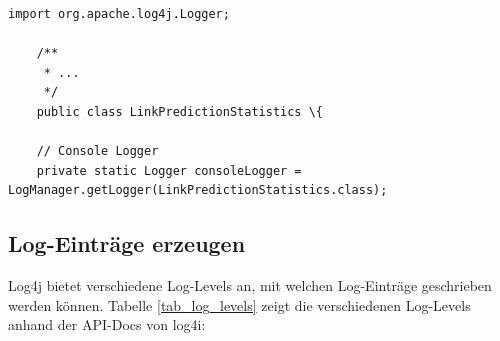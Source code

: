 \begin{lstlisting}[caption={Erzeugen eines Loggers},label=lstLoggerCreate]
    import org.apache.log4j.Logger;

    /**
     * ...
     */
    public class LinkPredictionStatistics \{

    // Console Logger
    private static Logger consoleLogger = LogManager.getLogger(LinkPredictionStatistics.class);
\end{lstlisting}

\subsection{Log-Einträge erzeugen}
Log4j bietet verschiedene Log-Levels an, mit welchen Log-Einträge geschrieben werden können.
Tabelle \ref{tab_log_levels} zeigt die verschiedenen Log-Levels anhand der \acs{API}-Docs von log4i:

